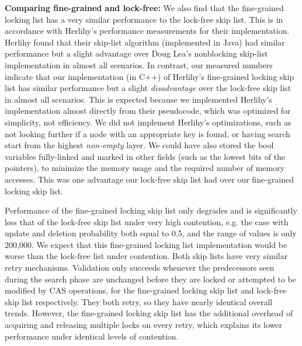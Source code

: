 \documentclass[11pt]{article}
\begin{document}
\textbf{Comparing fine-grained and lock-free:} We also find that the fine-grained locking list has a very similar performance to the lock-free skip list. This is in accordance with Herlihy's performance measurements for their implementation. Herlihy found that their skip-list algorithm (implemented in Java) had similar performance but a slight advantage over Doug Lea's nonblocking skip-list implementation in almost all scenarios.\cite{herlihy2006provably} In contrast, our measured numbers indicate that our implementation (in C++) of Herlihy's fine-grained locking skip list has similar performance but a slight \textit{disadvantage} over the lock-free skip list in almost all scenarios. This is expected because we implemented Herlihy's implementation almost directly from their pseudocode, which was optimized for simplicity, not efficiency. We did not implement Herlihy's optimizations, such as not looking further if a node with an appropriate key is found, or having search start from the highest \textit{non-empty} layer. We could have also stored the bool variables fully-linked and marked in other fields (such as the lowest bits of the pointers), to minimize the memory usage and the required number of memory accesses. This was one advantage our lock-free skip list had over our fine-grained locking skip list.

Performance of the fine-grained locking skip list only degrades and is significantly less that of the lock-free skip list under very high contention, e.g. the case with update and deletion probability both equal to 0.5, and the range of values is only 200,000. We expect that this fine-grained locking list implementation would be worse than the lock-free list under contention. Both skip lists have very similar retry mechanisms. Validation only succeeds whenever the predecessors seen during the search phase are unchanged before they are locked or attempted to be modified by CAS operations, for the fine-grained locking skip list and lock-free skip list respectively. They both retry, so they have nearly identical overall trends. However, the fine-grained locking skip list has the additional overhead of acquiring and releasing multiple locks on every retry, which explains its lower performance under identical levels of contention.
\end{document}
